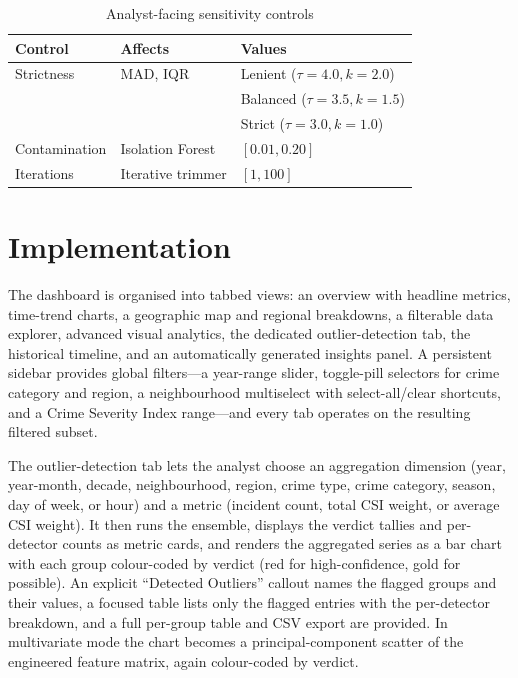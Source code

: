 \documentclass[conference]{IEEEtran}
\begin{document}
\begin{table}[t]
\caption{Analyst-facing sensitivity controls}
\label{tab:controls}
\centering
\begin{tabular}{lll}
\hline
\textbf{Control} & \textbf{Affects} & \textbf{Values} \\
\hline
Strictness & MAD, IQR & Lenient ($\tau{=}4.0, k{=}2.0$) \\
           &          & Balanced ($\tau{=}3.5, k{=}1.5$) \\
           &          & Strict ($\tau{=}3.0, k{=}1.0$) \\
Contamination & Isolation Forest & $[0.01, 0.20]$ \\
Iterations & Iterative trimmer & $[1, 100]$ \\
\hline
\end{tabular}
\end{table}

\section{Implementation}
The dashboard is organised into tabbed views: an overview with headline metrics, time-trend charts, a geographic map and regional breakdowns, a filterable data explorer, advanced visual analytics, the dedicated outlier-detection tab, the historical timeline, and an automatically generated insights panel. A persistent sidebar provides global filters---a year-range slider, toggle-pill selectors for crime category and region, a neighbourhood multiselect with select-all/clear shortcuts, and a Crime Severity Index range---and every tab operates on the resulting filtered subset.

The outlier-detection tab lets the analyst choose an aggregation dimension (year, year-month, decade, neighbourhood, region, crime type, crime category, season, day of week, or hour) and a metric (incident count, total CSI weight, or average CSI weight). It then runs the ensemble, displays the verdict tallies and per-detector counts as metric cards, and renders the aggregated series as a bar chart with each group colour-coded by verdict (red for high-confidence, gold for possible). An explicit ``Detected Outliers'' callout names the flagged groups and their values, a focused table lists only the flagged entries with the per-detector breakdown, and a full per-group table and CSV export are provided. In multivariate mode the chart becomes a principal-component scatter of the engineered feature matrix, again colour-coded by verdict.
\end{document}
